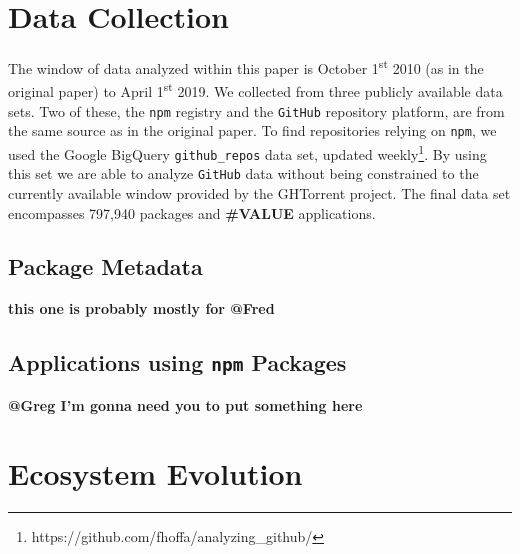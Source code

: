 \documentclass[10pt,conference]{IEEEtran}
\def\code#1{\texttt{#1}}
\begin{document}
\section{Data Collection}
The window of data analyzed within this paper is October 1\textsuperscript{st} 2010 (as in the original paper) to April 1\textsuperscript{st} 2019.
We collected from three publicly available data sets. Two of these, the \code{npm} registry and the \code{GitHub} repository platform, are from the same source as in the original paper.
To find repositories relying on \code{npm}, we used the Google BigQuery \code{github\_repos} data set, updated weekly\footnote{https://github.com/fhoffa/analyzing\_github/}.
By using this set we are able to analyze \code{GitHub} data without being constrained to the currently available window provided by the GHTorrent project\cite{Gousi13}.
The final data set encompasses 797,940 packages and \textbf{\#VALUE} applications.

\subsection{Package Metadata}

\textbf{this one is probably mostly for @Fred}

\subsection{Applications using \code{npm} Packages}

\textbf{@Greg I'm gonna need you to put something here}

\section{Ecosystem Evolution}
\end{document}
